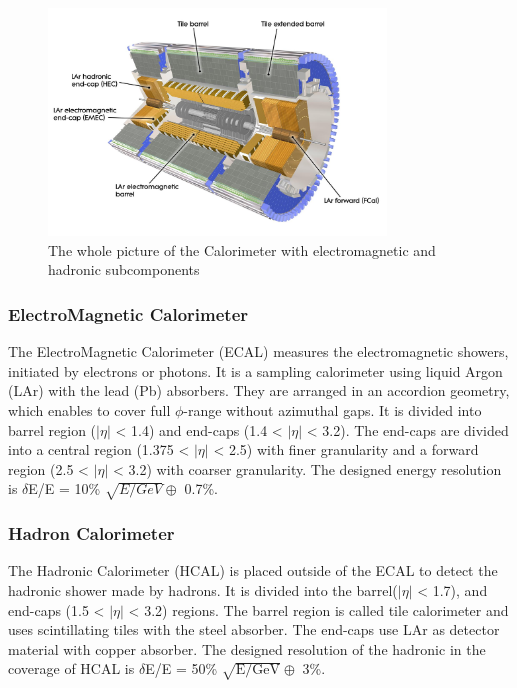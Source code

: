 \begin{figure}[tbp]
\begin{center}
 \includegraphics[width=0.8\textwidth,keepaspectratio]{figures/detector/Calo}
\caption{
The whole picture of the Calorimeter with electromagnetic and hadronic subcomponents
}
\label{fig:calo}
\end{center}
\end{figure}


\subsubsection{ElectroMagnetic Calorimeter}
The ElectroMagnetic Calorimeter (ECAL) measures the electromagnetic showers, initiated by electrons or photons. It is a sampling calorimeter using liquid Argon (LAr) with the lead (Pb) absorbers. They are arranged in an accordion geometry, which enables to cover full $\phi$-range without azimuthal gaps. It is divided into barrel region ($|\eta|$ < 1.4) and end-caps (1.4 < $|\eta|$ < 3.2). The end-caps are divided into a central region (1.375 < $|\eta|$ < 2.5) with finer granularity and a forward region (2.5 < $|\eta|$ < 3.2) with coarser granularity. The designed energy resolution is $\delta$E/E = 10\% $\sqrt{E/GeV} \oplus$ 0.7\%.

\subsubsection{Hadron Calorimeter}
The Hadronic Calorimeter (HCAL) is placed outside of the ECAL to detect the hadronic shower made by hadrons.
It is divided into the barrel($|\eta|$ < 1.7), and end-caps (1.5 < $|\eta|$ < 3.2) regions. 
The barrel region is called tile calorimeter and uses scintillating tiles with the steel absorber. 
The end-caps use LAr as detector material with copper absorber. 
The designed resolution of the hadronic in the coverage of HCAL is $\delta$E/E = 50\% $\sqrt{\mathrm{E/GeV}} \oplus$ 3\%.

